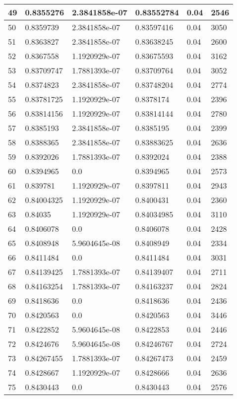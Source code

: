 \begin{longtable}{|l|l|l|l|l|l|}
49 & 0.8355276 & 2.3841858e-07 & 0.83552784 & 0.04 & 2546 \\ \hline 
50 & 0.8359739 & 2.3841858e-07 & 0.83597416 & 0.04 & 3050 \\ \hline 
51 & 0.8363827 & 2.3841858e-07 & 0.83638245 & 0.04 & 2600 \\ \hline 
52 & 0.8367558 & 1.1920929e-07 & 0.83675593 & 0.04 & 3162 \\ \hline 
53 & 0.83709747 & 1.7881393e-07 & 0.83709764 & 0.04 & 3052 \\ \hline 
54 & 0.8374823 & 2.3841858e-07 & 0.83748204 & 0.04 & 2774 \\ \hline 
55 & 0.83781725 & 1.1920929e-07 & 0.8378174 & 0.04 & 2396 \\ \hline 
56 & 0.83814156 & 1.1920929e-07 & 0.83814144 & 0.04 & 2780 \\ \hline 
57 & 0.8385193 & 2.3841858e-07 & 0.8385195 & 0.04 & 2399 \\ \hline 
58 & 0.8388365 & 2.3841858e-07 & 0.83883625 & 0.04 & 2636 \\ \hline 
59 & 0.8392026 & 1.7881393e-07 & 0.8392024 & 0.04 & 2388 \\ \hline 
60 & 0.8394965 & 0.0 & 0.8394965 & 0.04 & 2573 \\ \hline 
61 & 0.839781 & 1.1920929e-07 & 0.8397811 & 0.04 & 2943 \\ \hline 
62 & 0.84004325 & 1.1920929e-07 & 0.8400431 & 0.04 & 2360 \\ \hline 
63 & 0.84035 & 1.1920929e-07 & 0.84034985 & 0.04 & 3110 \\ \hline 
64 & 0.8406078 & 0.0 & 0.8406078 & 0.04 & 2428 \\ \hline 
65 & 0.8408948 & 5.9604645e-08 & 0.8408949 & 0.04 & 2334 \\ \hline 
66 & 0.8411484 & 0.0 & 0.8411484 & 0.04 & 3031 \\ \hline 
67 & 0.84139425 & 1.7881393e-07 & 0.84139407 & 0.04 & 2711 \\ \hline 
68 & 0.84163254 & 1.7881393e-07 & 0.84163237 & 0.04 & 2824 \\ \hline 
69 & 0.8418636 & 0.0 & 0.8418636 & 0.04 & 2436 \\ \hline 
70 & 0.8420563 & 0.0 & 0.8420563 & 0.04 & 3446 \\ \hline 
71 & 0.8422852 & 5.9604645e-08 & 0.8422853 & 0.04 & 2446 \\ \hline 
72 & 0.8424676 & 5.9604645e-08 & 0.84246767 & 0.04 & 2724 \\ \hline 
73 & 0.84267455 & 1.7881393e-07 & 0.84267473 & 0.04 & 2459 \\ \hline 
74 & 0.8428667 & 1.1920929e-07 & 0.8428666 & 0.04 & 2636 \\ \hline 
75 & 0.8430443 & 0.0 & 0.8430443 & 0.04 & 2576 \\ \hline 
\end{longtable}
